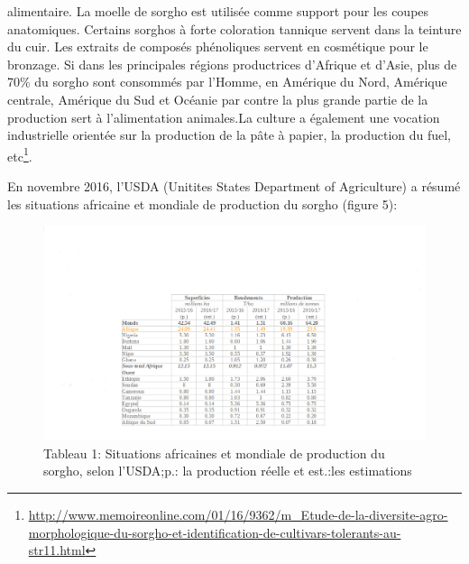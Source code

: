 \documentclass[a4paper,11pt]{article}
\begin{document}
alimentaire. La moelle de sorgho est utilisée comme support pour les
coupes anatomiques. Certains sorghos à forte coloration tannique
servent dans la teinture du cuir. Les extraits de composés phénoliques
servent en cosmétique pour le bronzage. Si dans les principales
régions productrices d’Afrique et d’Asie, plus de 70\% du sorgho sont
consommés par l’Homme, en Amérique du Nord, Amérique centrale,
Amérique du Sud et Océanie par contre la plus grande partie de la
production sert à l’alimentation animales\cite{BARRO_KONDOMBO_2010}.La
culture a également une vocation industrielle orientée sur la
production de la pâte à papier, la production du fuel,
etc\footnote{\url{http://www.memoireonline.com/01/16/9362/m_Etude-de-la-diversite-agro-morphologique-du-sorgho-et-identification-de-cultivars-tolerants-au-str11.html}}.

En novembre 2016, l’USDA (Unitites States Department of Agriculture) a résumé les situations africaine et mondiale de production du sorgho (figure 5):

\newpage

\begin{figure}%
  \begin{center}
   \includegraphics[width=14cm]{images/WorldSorghumStatisticsUsda}
  \end{center}
  \caption{Tableau 1: Situations africaines et mondiale de production du sorgho, selon l’USDA;p.:
    la production réelle et est.:les estimations}
\end{figure}



\end{document}
